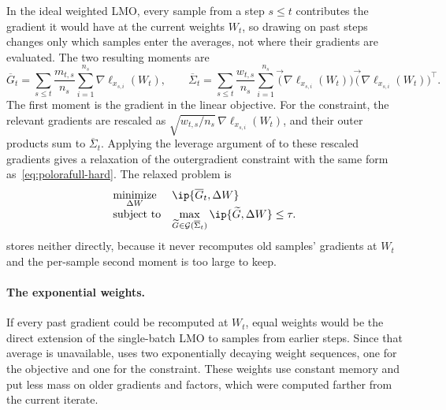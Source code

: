 In the ideal weighted LMO, every sample from a step $s\le t$ contributes
the gradient it would have at the current weights $W_t$, so drawing on past
steps changes only which samples enter the averages, not where their
gradients are evaluated. The two resulting moments are
\[
\overline G_t
  =
  \sum_{s\le t}\frac{m_{t,s}}{n_s}\sum_{i=1}^{n_s}
  \nabla\ell_{x_{s,i}}(W_t),
\qquad
\overline\Sigma_t
  =
  \sum_{s\le t}\frac{w_{t,s}}{n_s}\sum_{i=1}^{n_s}
  \vec(\nabla\ell_{x_{s,i}}(W_t))
  \vec(\nabla\ell_{x_{s,i}}(W_t))^\top .
\]
The first moment is the gradient in the linear objective. For the
constraint, the relevant gradients are rescaled as
$\sqrt{w_{t,s}/n_s}\,\nabla\ell_{x_{s,i}}(W_t)$, and their outer
products sum to $\overline\Sigma_t$. Applying the leverage argument of
 to these rescaled gradients gives a relaxation of
the outergradient constraint with the same form
as~\eqref{eq:polorafull-hard}. The relaxed problem is
\begin{equation}\label{eq:weighted-relaxed-p2}
 \begin{array}{ll}
  \underset{\Delta W}{\mathrm{minimize}} &
  \ip{\overline G_t, \Delta W} \\[2pt]
  \mbox{subject to} &
  \displaystyle
  \max_{\widetilde{G}\in\mathcal{G}(\overline\Sigma_t)}
  \ip{\widetilde{G},\Delta W}\le\tau .
  \end{array}
\end{equation}
 stores neither directly, because it never recomputes old
samples' gradients at $W_t$ and the per-sample second moment is too large
to keep.

\paragraph{The exponential weights.}
If every past gradient could be recomputed at $W_t$, equal weights would be
the direct extension of the single-batch LMO to samples from earlier steps.
Since that average is unavailable,  uses two exponentially
decaying weight sequences, one for the objective and one for the constraint.
These weights use constant memory and put less mass on older gradients and
factors, which were computed farther from the current iterate.


